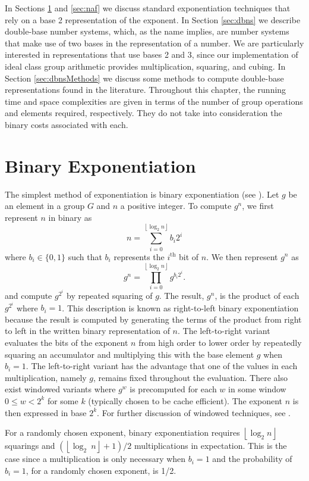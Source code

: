 \documentclass{ucalgthes1}
\theoremstyle{definition}
\newcommand{\floor}[1]{\left\lfloor #1 \right\rfloor}
\begin{document}
In Sections \ref{sec:binaryExp} and \ref{sec:naf} we discuss standard exponentiation techniques that rely on a base 2 representation of the exponent.  In Section \ref{sec:dbns} we describe double-base number systems, which, as the name implies, are number systems that make use of two bases in the representation of a number.  We are particularly interested in representations that use bases 2 and 3, since our implementation of ideal class group arithmetic provides multiplication, squaring, and cubing. In Section \ref{sec:dbnsMethods} we discuss some methods to compute double-base representations found in the literature.  Throughout this chapter, the running time and space complexities are given in terms of the number of group operations and elements required, respectively. They do not take into consideration the binary costs associated with each.


\section{Binary Exponentiation}
\label{sec:binaryExp}
The simplest method of exponentiation is binary exponentiation (see \cite[\S 9.1.1]{Cohen2006}).  Let $g$ be an element in a group $G$ and $n$ a positive integer.  To compute $g^n$, we first represent $n$ in binary as
\[
	n = \sum_{i=0}^{\floor{\log_2 n}} b_i 2^i
\]
where $b_i \in \{0, 1\}$ such that $b_i$ represents the $i^{\textrm{th}}$ bit of $n$.  We then represent $g^n$ as
\[
	g^n = \prod_{i=0}^{\floor{\log_2 n}} g^{b_i 2^i}.
\]
and compute $g^{2^i}$ by repeated squaring of $g$.  The result, $g^n$, is the product of each $g^{2^i}$ where $b_i = 1$.  This description is known as right-to-left binary exponentiation because the result is computed by generating the terms of the product from right to left in the written binary representation of $n$.  The left-to-right variant evaluates the bits of the exponent $n$ from high order to lower order by repeatedly squaring an accumulator and multiplying this with the base element $g$ when $b_i = 1$.  The left-to-right variant has the advantage that one of the values in each multiplication, namely $g$, remains fixed throughout the evaluation.  There also exist windowed variants where $g^w$ is precomputed for each $w$ in some window $0 \le w < 2^k$ for some $k$ (typically chosen to be cache efficient). The exponent $n$ is then expressed in base $2^k$.  For further discussion of windowed techniques, see \cite[Subsection~9.1.3.~p.149]{Cohen2006}.

For a randomly chosen exponent, binary exponentiation requires $\floor{\log_2 n}$ squarings and $\left(\floor{\log_2~n} + 1 \right)/2$ multiplications in expectation.  This is the case since a multiplication is only necessary when $b_i = 1$ and the probability of $b_i = 1$, for a randomly chosen exponent, is 1/2.
\end{document}
